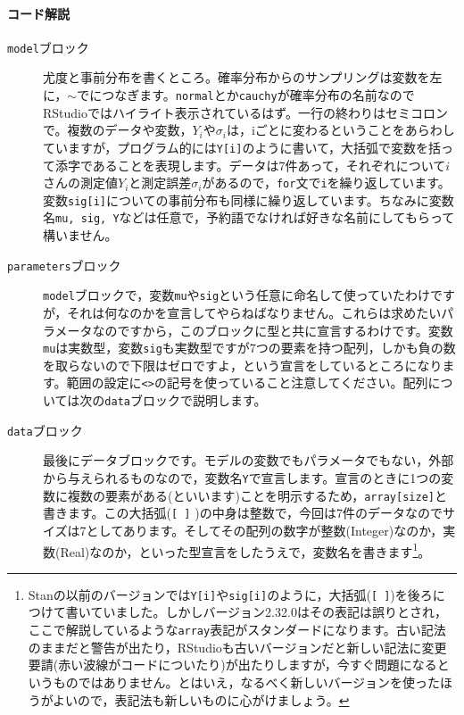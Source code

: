 \documentclass{ltjsbook}
\begin{document}
\paragraph{コード解説}
\begin{description}
	\item[\texttt{model}ブロック] 尤度と事前分布を書くところ。確率分布からのサンプリングは変数を左に，$\sim$でにつなぎます。\texttt{normal}とか\texttt{cauchy}が確率分布の名前なのでRStudioではハイライト表示されているはず。一行の終わりはセミコロンで。複数のデータや変数，$Y_i$や$\sigma_i$は，iごとに変わるということをあらわしていますが，プログラム的には\verb|Y[i]|のように書いて，大括弧で変数を括って添字であることを表現します。データは7件あって，それぞれについて$i$さんの測定値$Y_i$と測定誤差$\sigma_i$があるので，\texttt{for}文で\verb|i|を繰り返しています。変数\verb|sig[i]|についての事前分布も同様に繰り返しています。ちなみに変数名\texttt{mu, sig, Y}などは任意で，予約語でなければ好きな名前にしてもらって構いません。
	\item[\texttt{parameters}ブロック] \texttt{model}ブロックで，変数\texttt{mu}や\texttt{sig}という任意に命名して使っていたわけですが，それは何なのかを宣言してやらねばなりません。これらは求めたいパラメータなのですから，このブロックに型と共に宣言するわけです。変数\verb|mu|は実数型，変数\verb|sig|も実数型ですが7つの要素を持つ配列，しかも負の数を取らないので下限はゼロですよ，という宣言をしているところになります。範囲の設定に\verb|<>|の記号を使っていること注意してください。配列については次の\texttt{data}ブロックで説明します。
	\item[\texttt{data}ブロック] 最後にデータブロックです。モデルの変数でもパラメータでもない，外部から与えられるものなので，変数名\verb|Y|で宣言します。宣言のときに1つの変数に複数の要素がある(といいます)ことを明示するため，\verb|array[size]|と書きます。この大括弧(\verb|[ ]| )の中身は整数で，今回は7件のデータなのでサイズは7としてあります。そしてその配列の数字が整数(Integer)なのか，実数(Real)なのか，といった型宣言をしたうえで，変数名を書きます\footnote{Stanの以前のバージョンでは\verb|Y[i]|や\verb|sig[i]|のように，大括弧(\verb|[ ]|)を後ろにつけて書いていました。しかしバージョン2.32.0はその表記は誤りとされ，ここで解説しているような\verb|array|表記がスタンダードになります。古い記法のままだと警告が出たり，RStudioも古いバージョンだと新しい記法に変更要請(赤い波線がコードについたり)が出たりしますが，今すぐ問題になるというものではありません。とはいえ，なるべく新しいバージョンを使ったほうがよいので，表記法も新しいものに心がけましょう。}。
\end{description}
\end{document}
